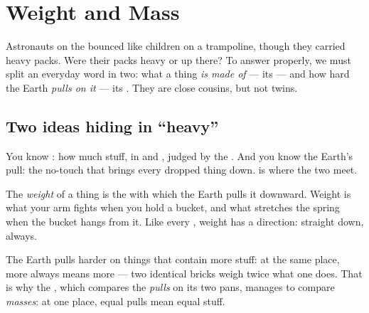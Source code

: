 \chapter{Weight and Mass}\label{ch:g4:weight-and-mass}

Astronauts on the  bounced like children on a trampoline,
though they carried heavy packs. Were their packs heavy or  up
there? To answer properly, we must split an everyday word in two:
what a thing \emph{is made of} --- its  --- and how hard the
Earth \emph{pulls on it} --- its . They are close cousins,
but not twins.

\section{Two ideas hiding in ``heavy''}

You know : how much stuff, in  and , judged by
the . And you know the Earth's pull: the no-touch
 that brings every dropped thing down.  is where the two
meet.

\begin{definition}[Weight]\label{def:g4:weight-and-mass:weight}
The \emph{weight} of a thing is the  with which
the Earth pulls it downward. Weight is what your arm fights when
you hold a bucket, and what stretches the spring when the bucket
hangs from it. Like every , weight has a direction: straight
down, always.
\end{definition}

\begin{proposition}\label{prop:g4:weight-and-mass:morestuff}
The Earth pulls harder on things that contain more stuff: at the
same place, more  always means more  --- two identical
bricks weigh twice what one does. That is why the ,
which compares the \emph{pulls} on its two pans, manages to compare
\emph{masses}: at one place, equal pulls mean equal stuff.
\end{proposition}

